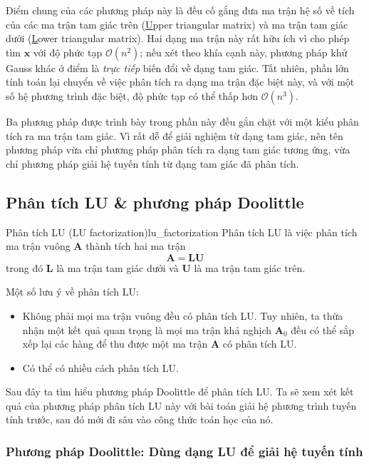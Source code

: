 \documentclass[../../Lectures]{subfiles}
\begin{document}
Điểm chung của các phương pháp này là đều cố gắng đưa ma trận hệ số về tích của
các ma trận tam giác trên (\underline{U}pper triangular matrix) và ma trận tam
giác dưới (\underline{L}ower triangular matrix). Hai dạng ma trận này rất hữu
ích vì cho phép tìm \(\bm{x}\) với độ phức tạp \(\mathcal{O} (n^2)\); nếu xét
theo khía cạnh này, phương pháp khử Gauss khác ở điểm là \emph{trực tiếp} biến
đổi về dạng tam giác. Tất nhiên, phần lớn tính toán lại chuyển về việc phân tích
ra dạng ma trận đặc biệt này, và với một số hệ phương trình đặc biệt, độ phức
tạp có thể thấp hơn \(\mathcal{O} (n^3)\).

Ba phương pháp được trình bày trong phần này đều gắn chặt với một kiểu phân tích
ra ma trận tam giác. Vì rất dễ để giải nghiệm từ dạng tam giác, nên tên phương
pháp vừa chỉ phương pháp phân tích ra dạng tam giác tương ứng, vừa chỉ phương
pháp giải hệ tuyến tính từ dạng tam giác đã phân tích.

\subsection{Phân tích LU \& phương pháp Doolittle}

\begin{cdefinition}{Phân tích LU (LU factorization)}{lu_factorization}
    Phân tích LU là việc phân tích ma trận vuông \(\bm{A}\) thành tích hai ma
    trận
    \[\bm{A} = \bm{LU}\]
    trong đó \(\bm{L}\) là ma trận tam giác dưới và \(\bm{U}\) là ma trận tam
    giác trên.
\end{cdefinition}

Một số lưu ý về phân tích LU:
\begin{itemize}
    \item Không phải mọi ma trận vuông đều có phân tích LU. Tuy nhiên, ta thừa
        nhận một kết quả quan trọng là mọi ma trận khả nghịch \(\bm{A}_0\) đều
        có thể sắp xếp lại các hàng để thu được một ma trận \(\bm{A}\) có phân
        tích LU.

    \item Có thể có nhiều cách phân tích LU.
\end{itemize}

Sau đây ta tìm hiểu phương pháp Doolittle để phân tích LU. Ta sẽ xem xét kết quả
của phương pháp phân tích LU này với bài toán giải hệ phương trình tuyến tính
trước, sau đó mới đi sâu vào công thức toán học của nó.

\subsubsection{Phương pháp Doolittle: Dùng dạng LU để giải hệ tuyến tính}
\end{document}
